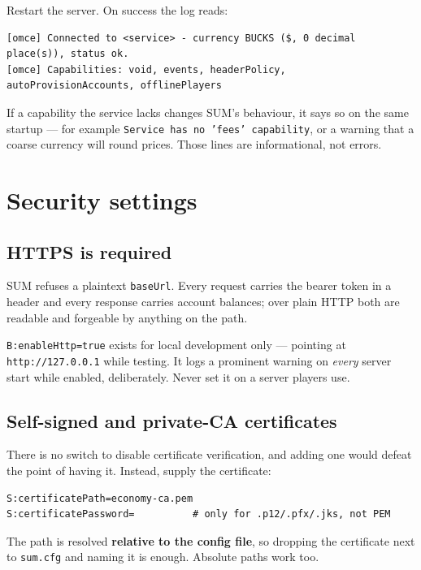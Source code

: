 \documentclass[11pt,a4paper]{article}
\newcommand{\code}[1]{\texttt{\small #1}}
\newcommand{\keybox}[2]{%
  \par\vspace{0.5em}\noindent
  \colorbox{#1}{\begin{minipage}{\dimexpr\linewidth-2\fboxsep\relax}
  \vspace{0.35em}\small #2\vspace{0.35em}\end{minipage}}\par\vspace{0.5em}}
\newcommand{\warn}[1]{\keybox{omceWarnWash}{#1}}
\begin{document}
Restart the server. On success the log reads:

\begin{lstlisting}
[omce] Connected to <service> - currency BUCKS ($, 0 decimal place(s)), status ok.
[omce] Capabilities: void, events, headerPolicy, autoProvisionAccounts, offlinePlayers
\end{lstlisting}

If a capability the service lacks changes SUM's behaviour, it says so on the same startup --- for
example \code{Service has no 'fees' capability}, or a warning that a coarse currency will round
prices. Those lines are informational, not errors.

\section{Security settings}
\label{sec:tls}

\subsection{HTTPS is required}

SUM refuses a plaintext \code{baseUrl}. Every request carries the bearer token in a header and
every response carries account balances; over plain HTTP both are readable and forgeable by
anything on the path.

\warn{\code{B:enableHttp=true} exists for local development only --- pointing at
\code{http://127.0.0.1} while testing. It logs a prominent warning on \emph{every} server start
while enabled, deliberately. Never set it on a server players use.}

\subsection{Self-signed and private-CA certificates}

There is no switch to disable certificate verification, and adding one would defeat the point of
having it. Instead, supply the certificate:

\begin{lstlisting}
S:certificatePath=economy-ca.pem
S:certificatePassword=          # only for .p12/.pfx/.jks, not PEM
\end{lstlisting}

The path is resolved \textbf{relative to the config file}, so dropping the certificate next to
\code{sum.cfg} and naming it is enough. Absolute paths work too.
\end{document}
